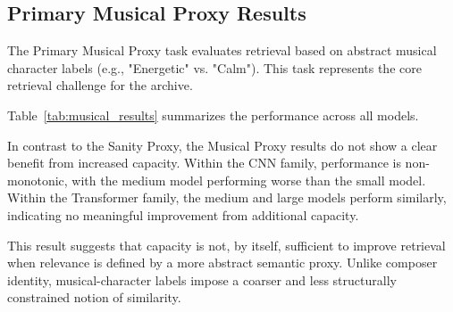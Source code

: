 \documentclass{article}
\begin{document}
\subsection{Primary Musical Proxy Results}

The Primary Musical Proxy task evaluates retrieval based on abstract musical character labels (e.g., "Energetic" vs. "Calm"). This task represents the core retrieval challenge for the archive.

Table~\ref{tab:musical_results} summarizes the performance across all models.

\begin{table}[!htbp]
\centering
\caption{Primary Musical Proxy Results (Character Retrieval). Metrics reported are corpus-level mean values at rank 5.}
\label{tab:musical_results}
\end{table}



In contrast to the Sanity Proxy, the Musical Proxy results do not show a clear benefit from increased
capacity. Within the CNN family, performance is non-monotonic, with the medium model performing worse
than the small model. Within the Transformer family,
the medium and large models perform similarly, indicating no meaningful
improvement from additional capacity.

This result suggests that capacity is not, by itself, sufficient to improve retrieval when relevance
is defined by a more abstract semantic proxy. Unlike composer identity, musical-character labels
impose a coarser and less structurally constrained notion of similarity.
\end{document}
